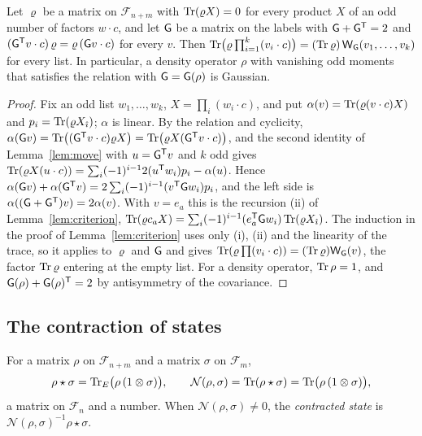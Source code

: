 \begin{theorem}\label{thm:criterion}
Let $\varrho$ be a matrix on $\mathcal F_{n+m}$ with $\operatorname{Tr}(\varrho X)=0$ for every product $X$ of an odd
number of factors $w\cdot c$, and let $\mathsf G$ be a matrix on the labels with $\mathsf G+\mathsf G^{\mathsf T}=2$ and
$(\mathsf G^{\mathsf T}v\cdot c)\,\varrho=\varrho\,(\mathsf G v\cdot c)$ for every $v$. Then
$\operatorname{Tr}\bigl(\varrho\prod_{i=1}^k(v_i\cdot c)\bigr)=(\operatorname{Tr}\varrho)\,\mathsf W_\mathsf G(v_1,\ldots,v_k)$ for every list. In
particular, a density operator $\rho$ with vanishing odd moments that satisfies the relation with
$\mathsf G=\mathsf G(\rho)$ is Gaussian.
\end{theorem}
\begin{proof}
Fix an odd list $w_1,\ldots,w_k$, $X=\prod_i(w_i\cdot c)$, and put $\alpha(v)=\operatorname{Tr}(\varrho(v\cdot c)X)$ and
$p_i=\operatorname{Tr}(\varrho X_{\hat\imath})$; $\alpha$ is linear. By the relation and cyclicity,
$\alpha(\mathsf G v)=\operatorname{Tr}\bigl((\mathsf G^{\mathsf T}v\cdot c)\varrho X\bigr)=\operatorname{Tr}\bigl(\varrho X(\mathsf G^{\mathsf T}v\cdot c)\bigr)$, and the
second identity of Lemma~\ref{lem:move} with $u=\mathsf G^{\mathsf T}v$ and $k$ odd gives
$\operatorname{Tr}(\varrho X(u\cdot c))=\sum_i(-1)^{i-1}2(u^{\mathsf T}w_i)p_i-\alpha(u)$. Hence
$\alpha(\mathsf G v)+\alpha(\mathsf G^{\mathsf T}v)=2\sum_i(-1)^{i-1}(v^{\mathsf T}\mathsf G w_i)p_i$, and the left side is
$\alpha((\mathsf G+\mathsf G^{\mathsf T})v)=2\alpha(v)$. With $v=e_a$ this is the recursion (ii) of
Lemma~\ref{lem:criterion}, $\operatorname{Tr}(\varrho c_aX)=\sum_i(-1)^{i-1}(e_a^{\mathsf T}\mathsf G w_i)\operatorname{Tr}(\varrho X_{\hat\imath})$.
The induction in the proof of Lemma~\ref{lem:criterion} uses only (i), (ii) and the linearity of
the trace, so it applies to $\varrho$ and $\mathsf G$ and gives
$\operatorname{Tr}(\varrho\prod(v_i\cdot c))=(\operatorname{Tr}\varrho)\mathsf W_\mathsf G(v)$, the factor $\operatorname{Tr}\varrho$ entering at the empty list.
For a density operator, $\operatorname{Tr}\rho=1$, and $\mathsf G(\rho)+\mathsf G(\rho)^{\mathsf T}=2$ by antisymmetry of the
covariance.
\end{proof}

\subsection{The contraction of states}
\label{sec:state-contraction}

\begin{definition}\label{def:state-contract}
For a matrix $\rho$ on $\mathcal F_{n+m}$ and a matrix $\sigma$ on $\mathcal F_m$,
\[
 \rho\star\sigma=\operatorname{Tr}_{E}\bigl(\rho\,(1\otimes\sigma)\bigr),\qquad
 \mathcal N(\rho,\sigma)=\operatorname{Tr}(\rho\star\sigma)=\operatorname{Tr}\bigl(\rho\,(1\otimes\sigma)\bigr),
\]
a matrix on $\mathcal F_n$ and a number. When $\mathcal N(\rho,\sigma)\neq0$, the
\emph{contracted state} is $\mathcal N(\rho,\sigma)^{-1}\rho\star\sigma$.
\end{definition}

